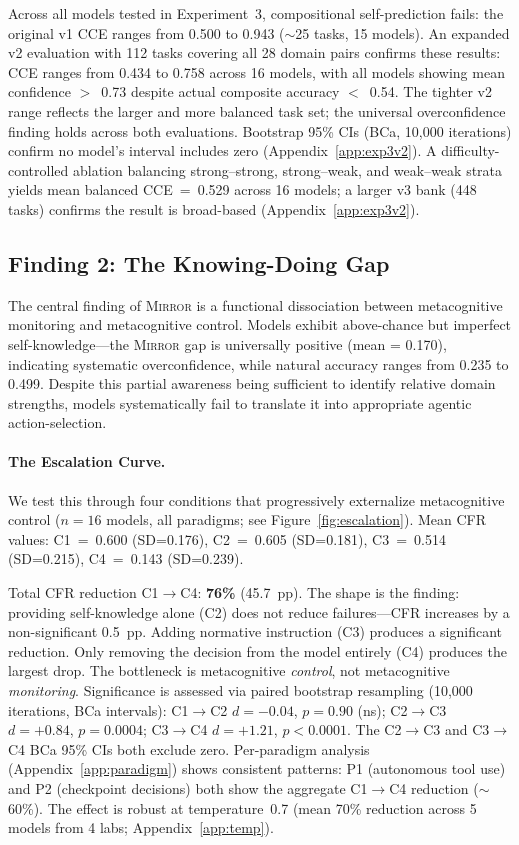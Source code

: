 \documentclass[10pt]{article}
\newcommand{\mirror}{\textsc{Mirror}}
\newcommand{\CCE}{CCE}
\newcommand{\CFR}{CFR}
\begin{document}
Across all models tested in Experiment~3, compositional self-prediction fails: the original v1 \CCE{} ranges from 0.500 to 0.943 (${\sim}$25 tasks, 15 models). An expanded v2 evaluation with 112 tasks covering all 28 domain pairs confirms these results: \CCE{} ranges from 0.434 to 0.758 across 16 models, with all models showing mean confidence $>$~0.73 despite actual composite accuracy $<$~0.54. The tighter v2 range reflects the larger and more balanced task set; the universal overconfidence finding holds across both evaluations. Bootstrap 95\% CIs (BCa, 10{,}000 iterations) confirm no model's interval includes zero (Appendix~\ref{app:exp3v2}). A difficulty-controlled ablation balancing strong--strong, strong--weak, and weak--weak strata yields mean balanced CCE~=~0.529 across 16 models; a larger v3 bank (448 tasks) confirms the result is broad-based (Appendix~\ref{app:exp3v2}).

\subsection{Finding 2: The Knowing-Doing Gap}

The central finding of \mirror{} is a functional dissociation between metacognitive
monitoring and metacognitive control. Models exhibit above-chance but imperfect self-knowledge---the \mirror{} gap is
universally positive (mean = 0.170), indicating systematic overconfidence, while
natural accuracy ranges from 0.235 to 0.499. Despite this partial awareness being
sufficient to identify relative domain strengths, models systematically fail to
translate it into appropriate agentic action-selection.

\paragraph{The Escalation Curve.}
We test this through four conditions that progressively externalize metacognitive
control ($n = 16$ models, all paradigms; see Figure~\ref{fig:escalation}).
Mean \CFR{} values: C1~=~0.600 (SD=0.176), C2~=~0.605 (SD=0.181), C3~=~0.514 (SD=0.215), C4~=~0.143 (SD=0.239).

Total \CFR{} reduction C1$\to$C4: \textbf{76\%} (45.7~pp).
The shape is the finding: providing self-knowledge alone (C2) does not reduce failures---\CFR{} increases by a non-significant 0.5~pp. Adding normative instruction (C3) produces a significant reduction. Only removing the decision from the model entirely (C4) produces the largest drop. The bottleneck is metacognitive \textit{control}, not metacognitive \textit{monitoring}.
Significance is assessed via paired bootstrap resampling (10{,}000 iterations, BCa intervals): C1$\to$C2 $d = -0.04$, $p = 0.90$ (ns); C2$\to$C3 $d = +0.84$, $p = 0.0004$; C3$\to$C4 $d = +1.21$, $p < 0.0001$. The C2$\to$C3 and C3$\to$C4 BCa 95\% CIs both exclude zero.
Per-paradigm analysis (Appendix~\ref{app:paradigm}) shows consistent patterns: P1 (autonomous tool use) and P2 (checkpoint decisions) both show the aggregate C1$\to$C4 reduction (${\sim}$60\%). The effect is robust at temperature~0.7 (mean 70\% reduction across 5 models from 4 labs; Appendix~\ref{app:temp}).
\end{document}
